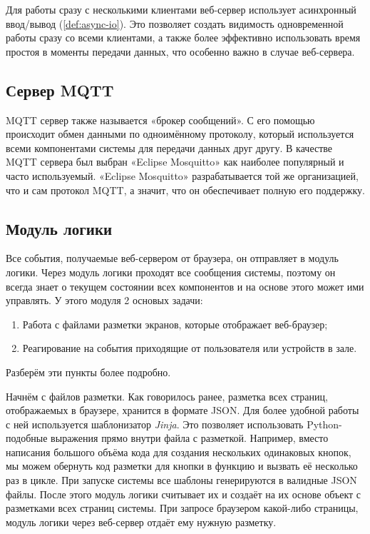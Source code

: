 Для работы сразу с несколькими клиентами веб-сервер использует асинхронный ввод/вывод (\ref{def:async-io}). Это позволяет
создать видимость одновременной работы сразу со всеми клиентами, а также более эффективно использовать время простоя в
моменты передачи данных, что особенно важно в случае веб-сервера.

\subsection{Сервер MQTT}

MQTT сервер также называется «брокер сообщений». С его помощью происходит обмен данными по одноимённому протоколу,
который используется всеми компонентами системы для передачи данных друг другу. В качестве MQTT сервера был выбран
«Eclipse Mosquitto» как наиболее популярный и часто используемый. «Eclipse Mosquitto» разрабатывается той же организацией,
что и сам протокол MQTT, а значит, что он обеспечивает полную его поддержку.

\subsection{Модуль логики}

Все события, получаемые веб-сервером от браузера, он отправляет в модуль логики. Через модуль логики проходят все сообщения
системы, поэтому он всегда знает о текущем состоянии всех компонентов и на основе этого может ими управлять. У этого
модуля 2 основых задачи:
\begin{enumerate}
    \item Работа с файлами разметки экранов, которые отображает веб-браузер;
    \item Реагирование на события приходящие от пользователя или устройств в зале.
\end{enumerate}
Разберём эти пункты более подробно.

Начнём с файлов разметки. Как говорилось ранее, разметка всех страниц, отображаемых в браузере, хранится в формате JSON.
Для более удобной работы с ней используется шаблонизатор \textit{Jinja}. Это позволяет использовать Python-подобные выражения
прямо внутри файла с разметкой. Например, вместо написания большого объёма кода для создания нескольких одинаковых кнопок,
мы можем обернуть код разметки для кнопки в функцию и вызвать её несколько раз в цикле. При запуске системы все шаблоны
генерируются в валидные JSON файлы. После этого модуль логики считывает их и создаёт на их основе объект с разметками
всех страниц системы. При запросе браузером какой-либо страницы, модуль логики через веб-сервер отдаёт ему нужную разметку.

